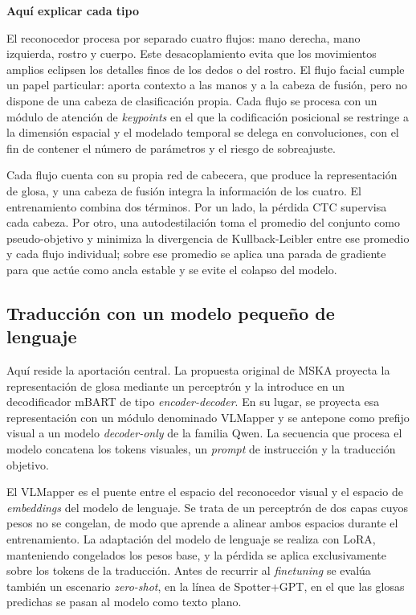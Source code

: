 \documentclass[11pt]{article}
\begin{document}
\textbf{Aquí explicar cada tipo}

El reconocedor procesa por separado cuatro flujos: mano derecha, mano izquierda, rostro y cuerpo. Este desacoplamiento evita que los movimientos amplios eclipsen los detalles finos de los dedos o del rostro. El flujo facial cumple un papel particular: aporta contexto a las manos y a la cabeza de fusión, pero no dispone de una cabeza de clasificación propia. Cada flujo se procesa con un módulo de atención de \textit{keypoints} en el que la codificación posicional se restringe a la dimensión espacial y el modelado temporal se delega en convoluciones, con el fin de contener el número de parámetros y el riesgo de sobreajuste.

Cada flujo cuenta con su propia red de cabecera, que produce la representación de glosa, y una cabeza de fusión integra la información de los cuatro. El entrenamiento combina dos términos. Por un lado, la pérdida CTC supervisa cada cabeza. Por otro, una autodestilación toma el promedio del conjunto como pseudo-objetivo y minimiza la divergencia de Kullback-Leibler entre ese promedio y cada flujo individual; sobre ese promedio se aplica una parada de gradiente para que actúe como ancla estable y se evite el colapso del modelo.

\subsection{Traducción con un modelo pequeño de lenguaje}

Aquí reside la aportación central. La propuesta original de MSKA proyecta la representación de glosa mediante un perceptrón y la introduce en un decodificador mBART de tipo \textit{encoder-decoder}. En su lugar, se proyecta esa representación con un módulo denominado VLMapper y se antepone como prefijo visual a un modelo \textit{decoder-only} de la familia Qwen. La secuencia que procesa el modelo concatena los tokens visuales, un \textit{prompt} de instrucción y la traducción objetivo.

El VLMapper es el puente entre el espacio del reconocedor visual y el espacio de \textit{embeddings} del modelo de lenguaje. Se trata de un perceptrón de dos capas cuyos pesos no se congelan, de modo que aprende a alinear ambos espacios durante el entrenamiento. La adaptación del modelo de lenguaje se realiza con LoRA, manteniendo congelados los pesos base, y la pérdida se aplica exclusivamente sobre los tokens de la traducción. Antes de recurrir al \textit{finetuning} se evalúa también un escenario \textit{zero-shot}, en la línea de Spotter+GPT, en el que las glosas predichas se pasan al modelo como texto plano.
\end{document}
